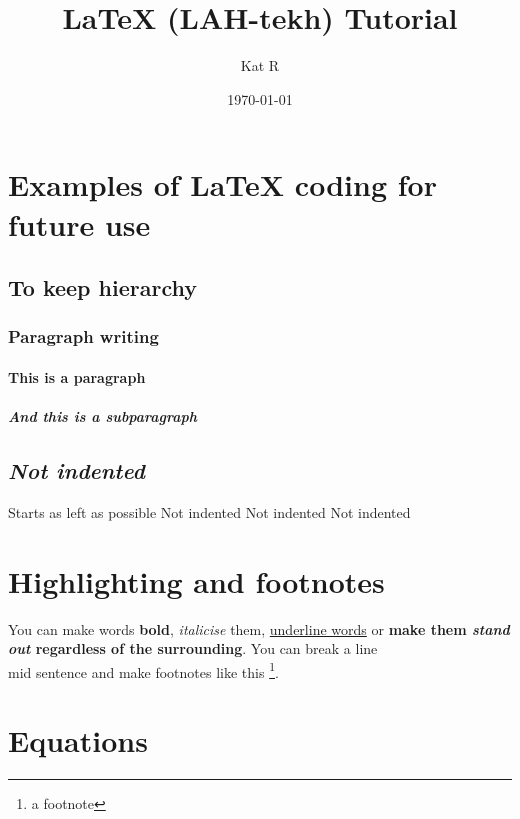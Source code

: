 \documentclass{article}
\title{LaTeX (LAH-tekh) Tutorial}
\author{Kat R}
\date{\today}
\begin{document}
\maketitle
\tableofcontents
\clearpage

\setcounter{page}{1}

\section{Examples of LaTeX coding for future use}
\subsection{To keep hierarchy}
\subsubsection{Paragraph writing}

\paragraph{This is a paragraph}
\lipsum[2]

\subparagraph{And this is a subparagraph}
\lipsum[3]

\subsection{\textit{Not indented}}

\noindent Starts as left as possible Not indented Not indented Not indented

\section{Highlighting and footnotes}
You can make words \textbf{bold}, \textit{italicise} them, \underline{underline words} or \textbf{make them \emph{stand out} regardless of the surrounding}. You can break a line\\ mid sentence and make footnotes like this \footnote{a footnote}.

\section{Equations}

\end{document}
